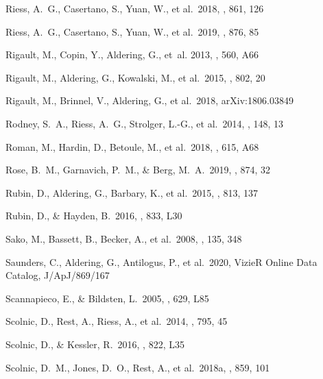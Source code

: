\documentclass[]{aa} %
\begin{document}
\begin{thebibliography}{}
 Riess, A.~G., Casertano, S., Yuan, W.,
et al.\ 2018, \apj, 861, 126

 Riess, A.~G., Casertano, S., Yuan, W.,
et al.\ 2019, \apj, 876, 85

 Rigault, M., Copin, Y.,
Aldering, G., {et~al.} 2013, \aap, 560, A66

 Rigault, M., Aldering, G., Kowalski,
M., et al.\ 2015, \apj, 802, 20

 Rigault, M., Brinnel, V., Aldering,
G., et al.\ 2018, arXiv:1806.03849

 Rodney, S.~A., Riess, A.~G., Strolger,
L.-G., et al.\ 2014, \aj, 148, 13 
  
 Roman, M., Hardin, D., Betoule, M., et
al.\ 2018, \aap, 615, A68

 Rose, B.~M., Garnavich, P.~M., \& Berg,
M.~A.\ 2019, \apj, 874, 32

 Rubin, D., Aldering, G., Barbary, K., et
al.\ 2015, \apj, 813, 137

 Rubin, D., \& Hayden, B.\ 2016,
\apjl, 833, L30


 Sako, M., Bassett, B., Becker, A., et al.\
2008, \aj, 135, 348

 Saunders, C., Aldering, G.,
Antilogus, P., et al.\ 2020, VizieR Online Data Catalog, J/ApJ/869/167

 Scannapieco, E., \&
Bildsten, L.\ 2005, \apjl, 629, L85 

 Scolnic, D., Rest, A., Riess, A., et
al.\ 2014, \apj, 795, 45

 Scolnic, D., \& Kessler, R.\
2016, \apjl, 822, L35

 Scolnic, D.~M., Jones, D.~O., Rest,
A., et al.\ 2018a, \apj, 859, 101



\end{thebibliography}
\end{document}
